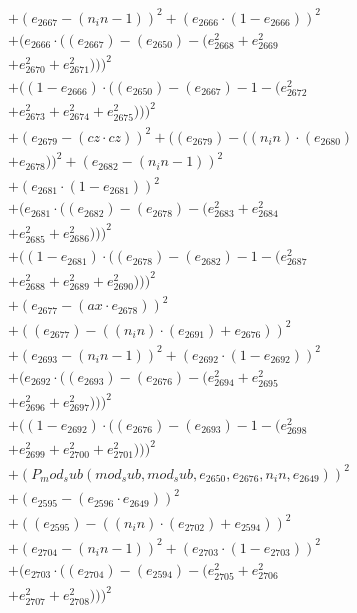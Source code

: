 \documentclass[10pt, a4paper]{article}
\begin{document}
\begin{align*}
& + (e_{2667} - (n_in - 1))^{2} + (e_{2666}  \cdot  (1 - e_{2666}))^{2} \\
& + (e_{2666}  \cdot  ((e_{2667}) - (e_{2650}) - (e_{2668}^{2} + e_{2669}^{2} \\
& + e_{2670}^{2} + e_{2671}^{2})))^{2} \\
& + ((1 - e_{2666})  \cdot  ((e_{2650}) - (e_{2667}) - 1 - (e_{2672}^{2} \\
& + e_{2673}^{2} + e_{2674}^{2} + e_{2675}^{2})))^{2} \\
& + (e_{2679} - (cz  \cdot  cz))^{2} + ((e_{2679}) - ((n_in)  \cdot  (e_{2680}) \\
& + e_{2678}))^{2} + (e_{2682} - (n_in - 1))^{2} \\
& + (e_{2681}  \cdot  (1 - e_{2681}))^{2} \\
& + (e_{2681}  \cdot  ((e_{2682}) - (e_{2678}) - (e_{2683}^{2} + e_{2684}^{2} \\
& + e_{2685}^{2} + e_{2686}^{2})))^{2} \\
& + ((1 - e_{2681})  \cdot  ((e_{2678}) - (e_{2682}) - 1 - (e_{2687}^{2} \\
& + e_{2688}^{2} + e_{2689}^{2} + e_{2690}^{2})))^{2} \\
& + (e_{2677} - (ax  \cdot  e_{2678}))^{2} \\
& + ((e_{2677}) - ((n_in)  \cdot  (e_{2691}) + e_{2676}))^{2} \\
& + (e_{2693} - (n_in - 1))^{2} + (e_{2692}  \cdot  (1 - e_{2692}))^{2} \\
& + (e_{2692}  \cdot  ((e_{2693}) - (e_{2676}) - (e_{2694}^{2} + e_{2695}^{2} \\
& + e_{2696}^{2} + e_{2697}^{2})))^{2} \\
& + ((1 - e_{2692})  \cdot  ((e_{2676}) - (e_{2693}) - 1 - (e_{2698}^{2} \\
& + e_{2699}^{2} + e_{2700}^{2} + e_{2701}^{2})))^{2} \\
& + (P_mod_sub(mod_sub, mod_sub, e_{2650}, e_{2676}, n_in, e_{2649}))^{2} \\
& + (e_{2595} - (e_{2596}  \cdot  e_{2649}))^{2} \\
& + ((e_{2595}) - ((n_in)  \cdot  (e_{2702}) + e_{2594}))^{2} \\
& + (e_{2704} - (n_in - 1))^{2} + (e_{2703}  \cdot  (1 - e_{2703}))^{2} \\
& + (e_{2703}  \cdot  ((e_{2704}) - (e_{2594}) - (e_{2705}^{2} + e_{2706}^{2} \\
& + e_{2707}^{2} + e_{2708}^{2})))^{2} \\

\end{align*}
\end{document}
